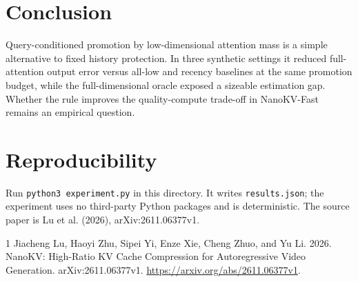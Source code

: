 \documentclass[11pt]{article}
\begin{document}
\section{Conclusion}
Query-conditioned promotion by low-dimensional attention mass is a simple alternative to fixed history protection. In three synthetic settings it reduced full-attention output error versus all-low and recency baselines at the same promotion budget, while the full-dimensional oracle exposed a sizeable estimation gap. Whether the rule improves the quality-compute trade-off in NanoKV-Fast remains an empirical question.

\section*{Reproducibility}
Run \texttt{python3 experiment.py} in this directory. It writes \texttt{results.json}; the experiment uses no third-party Python packages and is deterministic. The source paper is Lu et al. (2026), arXiv:2611.06377v1.

\begin{thebibliography}{1}
Jiacheng Lu, Haoyi Zhu, Sipei Yi, Enze Xie, Cheng Zhuo, and Yu Li. 2026. NanoKV: High-Ratio KV Cache Compression for Autoregressive Video Generation. arXiv:2611.06377v1. \url{https://arxiv.org/abs/2611.06377v1}.
\end{thebibliography}
\end{document}
